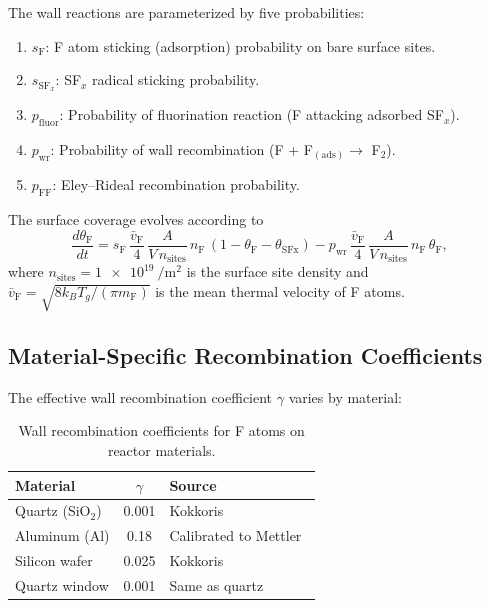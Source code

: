 \documentclass[11pt,a4paper]{report}
\newcommand{\SFx}{\mathrm{SF}_x}
\begin{document}
The wall reactions are parameterized by five probabilities:
\begin{enumerate}
  \item $s_\mathrm{F}$: F atom sticking (adsorption) probability on bare surface sites.
  \item $s_{\SFx}$: SF$_x$ radical sticking probability.
  \item $p_\mathrm{fluor}$: Probability of fluorination reaction (F attacking adsorbed SF$_x$).
  \item $p_\mathrm{wr}$: Probability of wall recombination (F + F$_\mathrm{(ads)} \to$ F$_2$).
  \item $p_\mathrm{FF}$: Eley--Rideal recombination probability.
\end{enumerate}

The surface coverage evolves according to
\begin{equation}
  \frac{d\theta_\mathrm{F}}{dt} = s_\mathrm{F}\,\frac{\bar{v}_\mathrm{F}}{4}\,\frac{A}{V\,n_\mathrm{sites}}\,n_\mathrm{F}\,(1 - \theta_\mathrm{F} - \theta_\mathrm{SFx}) - p_\mathrm{wr}\,\frac{\bar{v}_\mathrm{F}}{4}\,\frac{A}{V\,n_\mathrm{sites}}\,n_\mathrm{F}\,\theta_\mathrm{F},
\end{equation}
where $n_\mathrm{sites} = \SI{1e19}{\per\meter\squared}$ is the surface site density and $\bar{v}_\mathrm{F} = \sqrt{8k_BT_g/(\pi m_\mathrm{F})}$ is the mean thermal velocity of F atoms.

\subsection{Material-Specific Recombination Coefficients}

The effective wall recombination coefficient $\gamma$ varies by material:
\begin{table}[H]
\centering
\caption{Wall recombination coefficients for F atoms on reactor materials.}
\label{tab:gamma-values}
\begin{tabular}{lcl}
\toprule
\textbf{Material} & $\gamma$ & \textbf{Source} \\
\midrule
Quartz (SiO$_2$) & 0.001 & Kokkoris~\cite{Kokkoris2009} \\
Aluminum (Al)     & 0.18  & Calibrated to Mettler~\cite{Mettler2025} \\
Silicon wafer     & 0.025 & Kokkoris~\cite{Kokkoris2009} \\
Quartz window     & 0.001 & Same as quartz \\
\bottomrule
\end{tabular}
\end{table}
\end{document}
